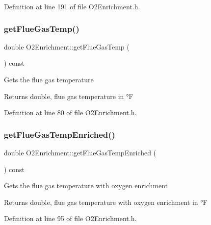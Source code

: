 Definition at line 191 of file O2\+Enrichment.\+h.

\mbox{\label{class_o2_enrichment_a53083756c50aaf89f755a132b62e999b}} 
\subsubsection{\texorpdfstring{get\+Flue\+Gas\+Temp()}{getFlueGasTemp()}}
{\footnotesize\ttfamily double O2\+Enrichment\+::get\+Flue\+Gas\+Temp (\begin{DoxyParamCaption}{ }\end{DoxyParamCaption}) const\hspace{0.3cm}{\ttfamily [inline]}}

Gets the flue gas temperature \begin{DoxyReturn}{Returns}
double, flue gas temperature in °F 
\end{DoxyReturn}


Definition at line 80 of file O2\+Enrichment.\+h.

\mbox{\label{class_o2_enrichment_ab69ee84a1b662e4c1f9a49d23acc6f00}} 
\subsubsection{\texorpdfstring{get\+Flue\+Gas\+Temp\+Enriched()}{getFlueGasTempEnriched()}}
{\footnotesize\ttfamily double O2\+Enrichment\+::get\+Flue\+Gas\+Temp\+Enriched (\begin{DoxyParamCaption}{ }\end{DoxyParamCaption}) const\hspace{0.3cm}{\ttfamily [inline]}}

Gets the flue gas temperature with oxygen enrichment \begin{DoxyReturn}{Returns}
double, flue gas temperature with oxygen enrichment in °F 
\end{DoxyReturn}


Definition at line 95 of file O2\+Enrichment.\+h.

\mbox{\label{class_o2_enrichment_a48d73aca893ac689880b1d10faa399a5}} 
